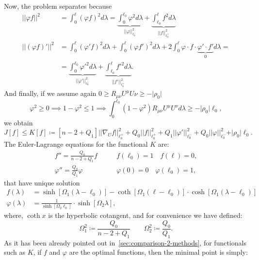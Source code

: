 Now, the problem separates because
\begin{align*}
    \vert\vert\varphi f\vert\vert^2 &= \int_0^{\ell} \left(\varphi f\right)^2 d\lambda = \underbrace{\int_0^{\ell_0}\varphi^2d\lambda}_{\vert\vert\varphi \vert\vert_{\ell_0^-}^2} + \underbrace{\int_{\ell_0}^{\ell}f^2d\lambda}_{\vert\vert f \vert\vert_{\ell_0^+}^2} \\
    \vert\vert\left(\varphi f\right)'\vert\vert^2 &= \int_0^{\ell} \left(\varphi' f\right)^2 d\lambda +\int_0^{\ell} \left(\varphi f'\right)^2 d\lambda + 2 \int_0^{\ell} \varphi\cdot f\cdot \underbrace{\varphi'\cdot f'}_{0}d\lambda = \\
    &= \underbrace{\int_0^{\ell_0}\varphi'^2d\lambda}_{\vert\vert\varphi '\vert\vert_{\ell_0^-}^2} + \underbrace{\int_{\ell_0}^{\ell}f'^2d\lambda}_{\vert\vert f' \vert\vert_{\ell_0^+}^2}.
\end{align*}
And finally, if we assume again \(0 \ge R_{\mu\nu}U^{\mu}U{\nu} \ge - \vert\rho_0\vert\) 
\[
\varphi^2 \ge 0 \implies 1 - \varphi^2 \le 1 \implies \int_0^{\ell_0} \left(1 - \varphi^2\right) R_{\mu\nu}U^{\mu}U^{\nu} d\lambda \ge -\vert\rho_0\vert \ell_0,    
\]
we obtain
\[
J[f] \le K[f] \coloneqq \left[n - 2 + Q_1\right] \vert\vert\nabla_U f \vert\vert_{\ell_0^+}^2 + Q_0\vert\vert f \vert\vert_{\ell_0^+}^2 + Q_1 \vert\vert\varphi '\vert\vert_{\ell_0^-}^2 + Q_0\vert\vert\varphi\vert\vert_{\ell_0^-}^2 + \vert\rho_0\vert \ell_0.
\]
The Euler-Lagrange equations for the functional \(K\) are:
\begin{align*}
    f '' = \frac{Q_0}{n -2 + Q_1}f \quad\quad &f(\ell_0) = 1 \quad f(\ell) = 0,\\
    \varphi'' = \frac{Q_0}{Q_1}\varphi \quad\quad &\varphi(0) = 0 \quad \varphi(\ell_0) = 1,
\end{align*}
that have unique solution
\begin{align*}
    f(\lambda) &= \sinh\left[\Omega_1(\lambda - \ell_0)\right]-\coth\left[\Omega_1(\ell - \ell_0)\right]\cdot\cosh\left[\Omega_1(\lambda - \ell_0)\right] \\
    \varphi(\lambda) &= \frac{1}{\sinh\left[\Omega_2\ell_0\right]} \cdot \sinh\left[\Omega_2\lambda\right],
\end{align*}
where, \(\coth x\) is the hyperbolic cotangent, and for convenience we have defined:
\[
\Omega_1^2 \coloneqq \frac{Q_0}{n - 2 + Q_1} \quad \quad  \Omega_2^2 \coloneqq \frac{Q_0}{Q_1}.
\]
As it has been already pointed out in~\ref{sec:comparison-2-methods}, for functionals such as \(K\), if \(f\) and \(\varphi\) are the optimal functions, then the minimal point is simply:
